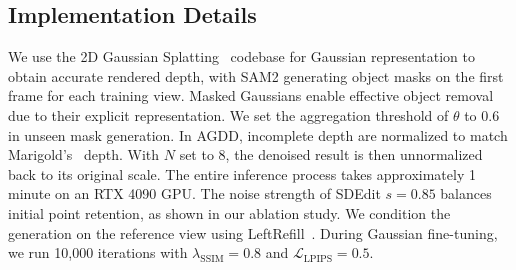 \subsection{Implementation Details}


We use the 2D Gaussian Splatting~\cite{huang20242d} codebase for Gaussian representation to obtain accurate rendered depth, with SAM2 generating object masks on the first frame for each training view. Masked Gaussians enable effective object removal due to their explicit representation. We set the aggregation threshold of \(\theta\) to 0.6 in unseen mask generation. In AGDD, incomplete depth are normalized to match Marigold's~\cite {ke2023repurposing} depth. With $N$ set to 8, the denoised result is then unnormalized back to its original scale. The entire inference process takes approximately 1 minute on an RTX 4090 GPU. The noise strength of SDEdit \(s = 0.85\) balances initial point retention, as shown in our ablation study. We condition the generation on the reference view using LeftRefill~\cite{cao2024leftrefill}. During Gaussian fine-tuning, we run 10,000 iterations with \(\lambda_{\text{SSIM}} = 0.8\) and \(\mathcal{L}_{\text{LPIPS}} = 0.5\).


